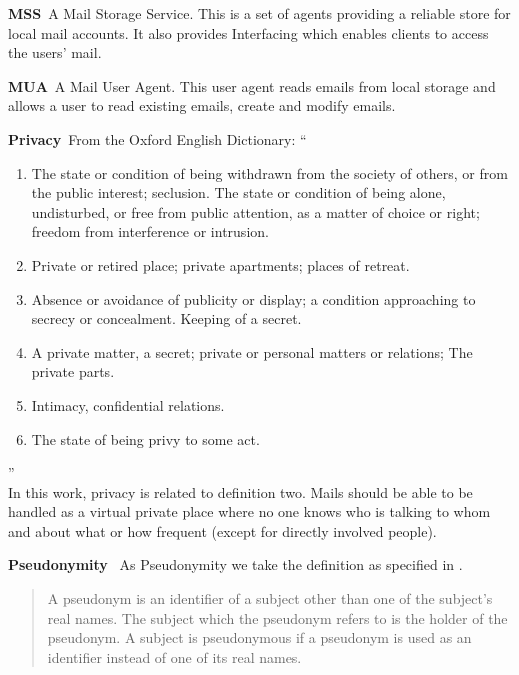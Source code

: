 \documentclass[a4paper,appendixprefix,pdfusetitle,twocolumn,fontsize=8pt,draft,DIV=calc]{scrbook}
\newenvironment{entry}{\par\leavevmode\hangpara{1.5mm}{1}\ignorespaces}{\RaggedRight\par}
\newcommand*{\mainentry}[2]{{\bfseries{#1\label{def:#1}}}~#2\par}
\begin{document}
\begin{entry}
	\mainentry{MSS}{A Mail Storage Service. This is a set of agents providing a reliable store for local mail accounts. It also provides Interfacing which enables clients to access the users' mail.}
\end{entry}

\begin{entry}
	\mainentry{MUA}{A Mail User Agent. This user agent reads emails from local storage and allows a user to read existing emails, create and modify emails.}
\end{entry}

\begin{entry}
	\mainentry{Privacy}{From the Oxford English Dictionary: ``
		\begin{enumerate}
			\item The state or condition of being withdrawn from the society of others, or from the public interest; seclusion. The state or condition of being alone, undisturbed, or free from public attention, as a matter of choice or right; freedom from interference or intrusion.
			\item Private or retired place; private apartments; places of retreat.
			\item Absence or avoidance of publicity or display; a condition approaching to secrecy or concealment. Keeping of a secret.
			\item A private matter, a secret; private or personal matters or relations; The private parts.
			\item Intimacy, confidential relations.
			\item The state of being privy to some act.
		\end{enumerate}''\cite{OXFORD}\\
		In this work, privacy is related to definition two. Mails should be able to be handled as a virtual private place where no one knows who is talking to whom and about what or how frequent (except for directly involved people).
	}
\end{entry}

\begin{entry}
	\mainentry{Pseudonymity}{
		As Pseudonymity we take the definition as specified in \cite{anonTerminology}.
		\begin{quote}
			A pseudonym is an identifier of a subject other than one of the subject's real names. The subject which the pseudonym refers to is the holder of the pseudonym. A subject is pseudonymous if a pseudonym is used as an identifier instead of one of its real names.\omitted
		\end{quote}
	}
\end{entry}
\end{document}
